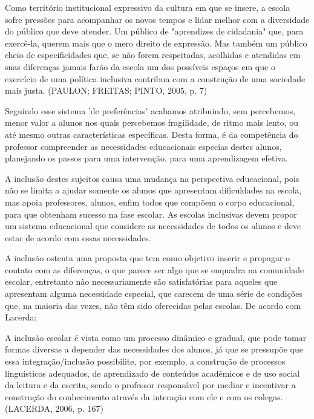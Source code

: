 \documentclass[brasil]{abnt}
\begin{document}
		\begin{citacao}Como território institucional expressivo da cultura em que se insere, a escola sofre pressões para acompanhar os novos tempos e lidar melhor com a diversidade do público que deve atender. 
						Um público de "aprendizes de cidadania" que, para exercê-la, querem mais que o mero direito de expressão. Mas também um público cheio de especificidades que, se não forem respeitadas, 
						acolhidas e atendidas em suas diferenças jamais farão da escola um dos possíveis espaços em que o exercício de uma política inclusiva contribua com a construção de uma sociedade mais 
						justa. (PAULON; FREITAS; PINTO, 2005, p. 7)
		\end{citacao}
	
	Seguindo esse sistema 'de preferências' acabamos atribuindo, sem percebemos, menor valor a alunos nos quais percebemos fragilidade, de ritmo mais lento, ou até mesmo outras características específicas. 
	Desta forma, é da competência do professor compreender as necessidades educacionais especias destes alunos, planejando os passos para uma intervenção, para uma aprendizagem efetiva.
		
 	A inclusão destes sujeitos causa uma mudança na perspectiva educacional, pois não se limita a ajudar somente os alunos que apresentam dificuldades na escola, mas apoia professores, alunos,
	enfim todos que compõem o corpo educacional, para que obtenham sucesso na fase escolar. As escolas inclusivas devem propor um sistema educacional que considere as necessidades de todos os alunos e 
	deve estar de acordo com essas necessidades. 
		
	A inclusão ostenta uma proposta que tem como objetivo inserir e propagar o contato com as diferenças, o que parece ser algo que se enquadra na comunidade escolar, entretanto não necessariamente 
	são satisfatórias para aqueles que apresentam alguma necessidade especial, que carecem de uma série de condições que, na maioria das vezes, não têm sido oferecidas pelas escolas. De acordo com Lacerda:
		
			\begin{citacao}A inclusão escolar é vista como um processo dinâmico e gradual, que pode tomar formas diversas a depender das necessidades dos alunos, já que se pressupõe que essa integração/inclusão 
							possibilite, por exemplo, a construção de processos linguísticos adequados, de aprendizado de conteúdos acadêmicos e de uso social da leitura e da escrita, sendo o professor 
							responsável por mediar e incentivar a construção do conhecimento através da interação com ele e com os colegas. (LACERDA, 2006, p. 167)
			\end{citacao}
			
\end{document}
